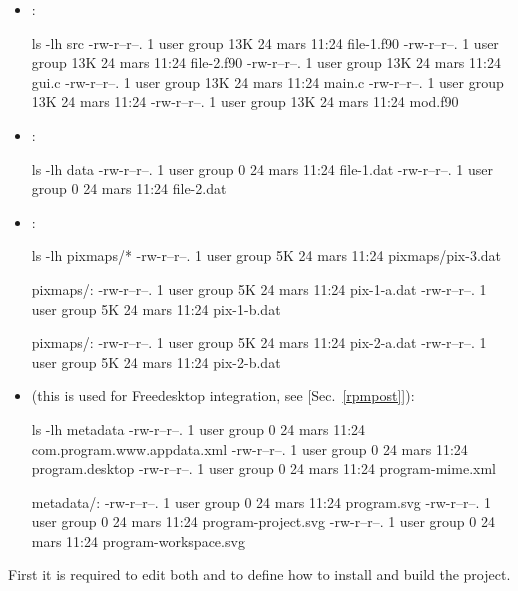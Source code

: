 \begin{itemize}
\item {}:
{\footnotesize{
\begin{scripti}
 ls -lh src
-rw-r--r--. 1 user group 13K 24 mars  11:24 file-1.f90
-rw-r--r--. 1 user group 13K 24 mars  11:24 file-2.f90
-rw-r--r--. 1 user group 13K 24 mars  11:24 gui.c
-rw-r--r--. 1 user group 13K 24 mars  11:24 main.c
-rw-r--r--. 1 user group 13K 24 mars  11:24 
-rw-r--r--. 1 user group 13K 24 mars  11:24 mod.f90
\end{scripti}
}}
\vspace{-0.75cm} \item {}:
{\footnotesize{
\begin{scripti}
 ls -lh data
-rw-r--r--. 1 user group 0 24 mars  11:24 file-1.dat
-rw-r--r--. 1 user group 0 24 mars  11:24 file-2.dat
\end{scripti}
}}
\vspace{-0.75cm}
\item {}:
{\footnotesize{
\begin{scripti}
 ls -lh pixmaps/*
-rw-r--r--. 1 user group 5K 24 mars  11:24 pixmaps/pix-3.dat

pixmaps/:
-rw-r--r--. 1 user group 5K 24 mars  11:24 pix-1-a.dat
-rw-r--r--. 1 user group 5K 24 mars  11:24 pix-1-b.dat

pixmaps/:
-rw-r--r--. 1 user group 5K 24 mars  11:24 pix-2-a.dat
-rw-r--r--. 1 user group 5K 24 mars  11:24 pix-2-b.dat
\end{scripti}
}}
\vspace{-0.75cm} \item {} (this is used for Freedesktop integration, see [Sec.~\ref{rpmpost}]):
{\footnotesize{
\begin{scripti}
 ls -lh metadata
-rw-r--r--. 1 user group 0 24 mars  11:24 com.program.www.appdata.xml
-rw-r--r--. 1 user group 0 24 mars  11:24 program.desktop
-rw-r--r--. 1 user group 0 24 mars  11:24 program-mime.xml

metadata/:
-rw-r--r--. 1 user group 0 24 mars  11:24 program.svg
-rw-r--r--. 1 user group 0 24 mars  11:24 program-project.svg
-rw-r--r--. 1 user group 0 24 mars  11:24 program-workspace.svg
\end{scripti}
}}
\end{itemize}
\vspace{-0.5cm}
First it is required to edit both  and  to define how to install and build the project. \\[0.25cm] 
